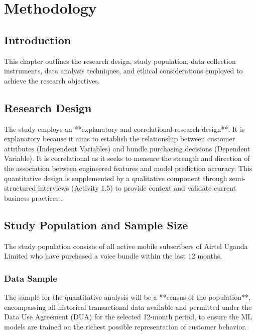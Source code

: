 \documentclass[12pt, a4paper]{report}
\begin{document}
\chapter{Methodology}
\label{ch:methodology}

\section{Introduction}
This chapter outlines the research design, study population, data collection instruments, data analysis techniques, and ethical considerations employed to achieve the research objectives.

\section{Research Design}
The study employs an **explanatory and correlational research design**. It is explanatory because it aims to establish the relationship between customer attributes (Independent Variables) and bundle purchasing decisions (Dependent Variable). It is correlational as it seeks to measure the strength and direction of the association between engineered features and model prediction accuracy. This quantitative design is supplemented by a qualitative component through semi-structured interviews (Activity 1.5) to provide context and validate current business practices \citep{saunders2019research}.

\section{Study Population and Sample Size}
The study population consists of all active mobile subscribers of Airtel Uganda Limited who have purchased a voice bundle within the last 12 months.

\subsection{Data Sample}
The sample for the quantitative analysis will be a **census of the population**, encompassing all historical transactional data available and permitted under the Data Use Agreement (DUA) for the selected 12-month period, to ensure the ML models are trained on the richest possible representation of customer behavior.
\end{document}
